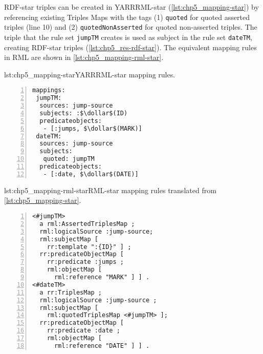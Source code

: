 RDF-star triples can be created in YARRRML-star (\cref{lst:chp5_mapping-star}) by referencing existing Triples Maps with the tags (1) \texttt{quoted} for quoted asserted triples (line 10) and (2) \texttt{quotedNonAss\-erted} for quoted non-asserted triples.  
The triple that the rule set \texttt{jumpTM} creates is used as subject in the rule set \texttt{dateTM}, creating RDF-star triples (\cref{lst:chp5_res-rdf-star}). The equivalent mapping rules in RML are shown in \cref{lst:chp5_mapping-rml-star}.  

\begin{minipage}{\linewidth}
\centering
\begin{captionedlisting}{lst:chp5_mapping-star}{YARRRML-star mapping rules. }
\centering
\begin{multicols}{2}
{\begin{lstlisting}[numbers=left,basicstyle=\ttfamily\small,columns=flexible,language=yarrrmlstar]
mappings:
 jumpTM:
  sources: jump-source
  subjects: :$\dollar$(ID)
  predicateobjects:
   - [:jumps, $\dollar$(MARK)]
 dateTM:
  sources: jump-source
  subjects:
   quoted: jumpTM
  predicateobjects:
   - [:date, $\dollar$(DATE)]
\end{lstlisting}}

\end{multicols}
\end{captionedlisting}
\end{minipage}

\begin{minipage}{\linewidth}
\centering
\begin{captionedlisting}{lst:chp5_mapping-rml-star}{RML-star mapping rules translated from \cref{lst:chp5_mapping-star}. }
\centering
\begin{multicols}{2}
{\begin{lstlisting}[numbers=left,basicstyle=\ttfamily\small,columns=flexible,language=rmlstar]
<#jumpTM> 
  a rml:AssertedTriplesMap ;
  rml:logicalSource :jump-source;
  rml:subjectMap [ 
    rr:template ":{ID}" ] ;
  rr:predicateObjectMap [ 
    rr:predicate :jumps ;
    rml:objectMap [
      rml:reference "MARK" ] ] .
<#dateTM> 
  a rr:TriplesMap ;
  rml:logicalSource :jump-source ;
  rml:subjectMap [ 
    rml:quotedTriplesMap <#jumpTM> ];
  rr:predicateObjectMap [ 
    rr:predicate :date ;
    rml:objectMap [
      rml:reference "DATE" ] ] .
\end{lstlisting}}

\end{multicols}
\end{captionedlisting}
\end{minipage}





